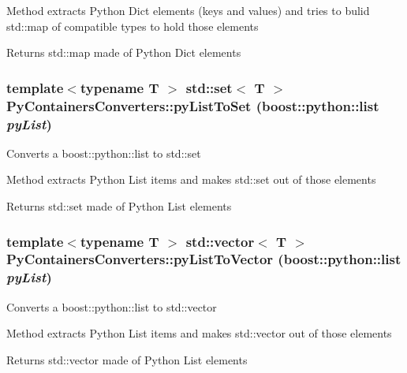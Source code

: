 Method extracts Python Dict elements (keys and values) and tries to bulid std::map of compatible types to hold those elements \begin{DoxyReturn}{Returns}
std::map made of Python Dict elements 
\end{DoxyReturn}
\hypertarget{namespace_py_containers_converters_acd8fbea72afcee1385a61c81b170098b}{
\subsubsection[{pyListToSet}]{\setlength{\rightskip}{0pt plus 5cm}template$<$typename T $>$ std::set$<$ T $>$ PyContainersConverters::pyListToSet (boost::python::list {\em pyList})}}
\label{namespace_py_containers_converters_acd8fbea72afcee1385a61c81b170098b}
Converts a boost::python::list to std::set

Method extracts Python List items and makes std::set out of those elements \begin{DoxyReturn}{Returns}
std::set made of Python List elements 
\end{DoxyReturn}
\hypertarget{namespace_py_containers_converters_a8f3d92c41544fc4ee156509eaaf68729}{
\subsubsection[{pyListToVector}]{\setlength{\rightskip}{0pt plus 5cm}template$<$typename T $>$ std::vector$<$ T $>$ PyContainersConverters::pyListToVector (boost::python::list {\em pyList})}}
\label{namespace_py_containers_converters_a8f3d92c41544fc4ee156509eaaf68729}
Converts a boost::python::list to std::vector

Method extracts Python List items and makes std::vector out of those elements \begin{DoxyReturn}{Returns}
std::vector made of Python List elements 
\end{DoxyReturn}
